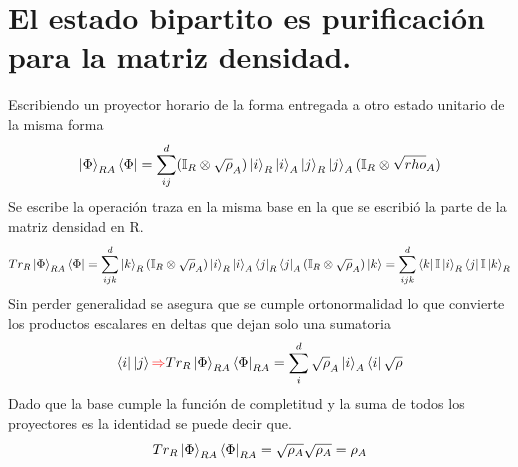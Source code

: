 \documentclass{book}
\begin{document}
\section{{El estado bipartito es purificación para la matriz densidad.}}
Escribiendo un proyector horario de la forma entregada a otro estado unitario de la misma forma
\begin{equation} {\ket{\Phi}_{RA} \bra{\Phi}=\sum_{ij}^d (\mathbb{I} _R\otimes\sqrt{\rho}_A) \ket{i}_R\ket{i}_A \ket{j}_R \ket{j}_A (\mathbb{I}_R\otimes \sqrt{rho}_A) } \end{equation}
Se escribe la operación traza en la misma base en la que se escribió la parte de la matriz densidad en R. 
\begin{equation} {Tr_R\ket{\Phi}_{RA} \bra{\Phi}=\sum_{ijk}^d \ket{k}_R (\mathbb{I} _R\otimes\sqrt{\rho}_A) \ket{i}_R\ket{i}_A \bra{j}_R \bra{j}_A (\mathbb{I}_R\otimes \sqrt{\rho}_A)\ket{k} =\sum_{ijk}^d \bra{k}\mathbb{I} \ket{i}_R\bra{j} \mathbb{I} \ket{k}_R} \end{equation}
Sin  perder generalidad se asegura que se cumple ortonormalidad lo que convierte los productos  escalares en deltas que dejan solo una sumatoria
\begin{equation} {\bra{i} \ket{j} \textcolor{red}{\Rightarrow} Tr_R\ket{\Phi}_{RA} \bra{\Phi}_{RA}=\sum_i^d \sqrt{\rho}_A \ket{i}_A\bra{i} \sqrt{\rho}} \end{equation}
Dado que la base cumple la función de completitud y la suma de todos los proyectores es la identidad se puede decir que. 
\begin{equation} {Tr_R\ket{\Phi}_{RA} \bra{\Phi}_{RA} =\sqrt{\rho_A} \sqrt{\rho_A} =\rho_A} \end{equation}
\end{document}

